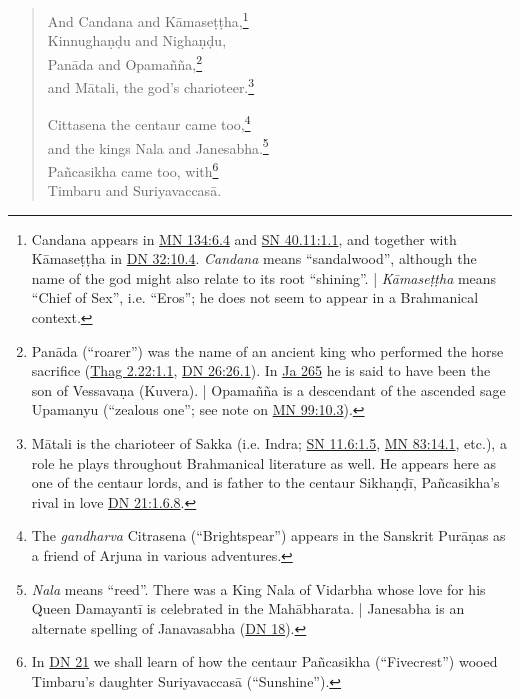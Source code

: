 \documentclass[12pt,openany]{book}%
\begin{document}
\begin{verse}
And Candana and \textsanskrit{Kāmaseṭṭha},\footnote{Candana appears in \href{https://suttacentral.net/mn134/en/sujato\#6.4}{MN 134:6.4} and \href{https://suttacentral.net/sn40.11/en/sujato\#1.1}{SN 40.11:1.1}, and together with \textsanskrit{Kāmaseṭṭha} in \href{https://suttacentral.net/dn32/en/sujato\#10.4}{DN 32:10.4}. \textit{Candana} means “sandalwood”, although the name of the god might also relate to its root “shining”. | \textit{\textsanskrit{Kāmaseṭṭha}} means “Chief of Sex”, i.e. “Eros”; he does not seem to appear in a Brahmanical context. } \\
\textsanskrit{Kinnughaṇḍu} and \textsanskrit{Nighaṇḍu}, \\
\textsanskrit{Panāda} and \textsanskrit{Opamañña},\footnote{\textsanskrit{Panāda} (“roarer”) was the name of an ancient king who performed the horse sacrifice (\href{https://suttacentral.net/thag2.22/en/sujato\#1.1}{Thag 2.22:1.1}, \href{https://suttacentral.net/dn26/en/sujato\#26.1}{DN 26:26.1}). In \href{https://suttacentral.net/ja265/en/sujato}{Ja 265} he is said to have been the son of \textsanskrit{Vessavaṇa} (Kuvera). | \textsanskrit{Opamañña} is a descendant of the ascended sage Upamanyu (“zealous one”; see note on \href{https://suttacentral.net/mn99/en/sujato\#10.3}{MN 99:10.3}). } \\
and \textsanskrit{Mātali}, the god’s charioteer.\footnote{\textsanskrit{Mātali} is the charioteer of Sakka (i.e. Indra; \href{https://suttacentral.net/sn11.6/en/sujato\#1.5}{SN 11.6:1.5}, \href{https://suttacentral.net/mn83/en/sujato\#14.1}{MN 83:14.1}, etc.), a role he plays throughout Brahmanical literature as well. He appears here as one of the centaur lords, and is father to the centaur \textsanskrit{Sikhaṇḍī}, \textsanskrit{Pañcasikha}’s rival in love \href{https://suttacentral.net/dn21/en/sujato\#1.6.8}{DN 21:1.6.8}. } 

Cittasena the centaur came too,\footnote{The \textit{gandharva} Citrasena (“Brightspear”) appears in the Sanskrit \textsanskrit{Purāṇas} as a friend of Arjuna in various adventures. } \\
and the kings Nala and Janesabha.\footnote{\textit{Nala} means “reed”. There was a King Nala of Vidarbha whose love for his Queen \textsanskrit{Damayantī} is celebrated in the \textsanskrit{Mahābharata}. | Janesabha is an alternate spelling of Janavasabha (\href{https://suttacentral.net/dn18/en/sujato}{DN 18}). } \\
\textsanskrit{Pañcasikha} came too, with\footnote{In \href{https://suttacentral.net/dn21/en/sujato}{DN 21} we shall learn of how the centaur \textsanskrit{Pañcasikha} (“Fivecrest”) wooed Timbaru’s daughter \textsanskrit{Suriyavaccasā} (“Sunshine”). } \\
Timbaru and \textsanskrit{Suriyavaccasā}. 


\end{verse}
\end{document}
